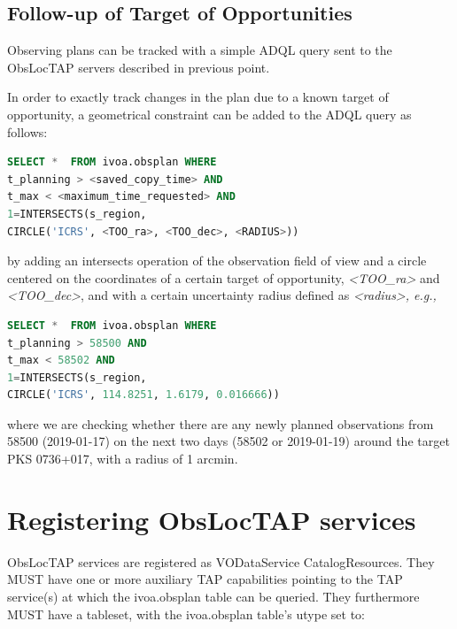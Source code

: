 \documentclass[11pt,a4paper]{ivoa}
\begin{document}
\subsection{Follow-up of Target of Opportunities}
Observing plans can be tracked with a simple ADQL query sent to the ObsLocTAP
servers described in previous point.
\par

In order to exactly track changes in the plan due to a known target of
opportunity, a geometrical constraint can be added to the ADQL query as follows:

\begin{lstlisting}[language=SQL]
SELECT *  FROM ivoa.obsplan WHERE
t_planning > <saved_copy_time> AND
t_max < <maximum_time_requested> AND
1=INTERSECTS(s_region,
CIRCLE('ICRS', <TOO_ra>, <TOO_dec>, <RADIUS>))
\end{lstlisting}

by adding an intersects operation of the observation field of view and a circle
centered on the coordinates of a certain target of opportunity,
\textit{<TOO\_ra>} and \textit{<TOO\_dec>}, and with a certain uncertainty
radius defined as \textit{<radius>, e.g.,}

\begin{lstlisting}[language=SQL]
SELECT *  FROM ivoa.obsplan WHERE
t_planning > 58500 AND
t_max < 58502 AND
1=INTERSECTS(s_region,
CIRCLE('ICRS', 114.8251, 1.6179, 0.016666))
\end{lstlisting}
where we are checking whether there are any newly planned observations from
58500 (2019-01-17) on the next two days (58502 or 2019-01-19) around the target
PKS 0736+017, with a radius of 1 arcmin.
\par


\section{Registering ObsLocTAP services}

ObsLocTAP services are registered as VODataService CatalogResources. They MUST
have one or more auxiliary TAP capabilities pointing to the TAP service(s) at
which the ivoa.obsplan table can be queried. They furthermore MUST have a
tableset, with the ivoa.obsplan table's utype set to:
\end{document}
